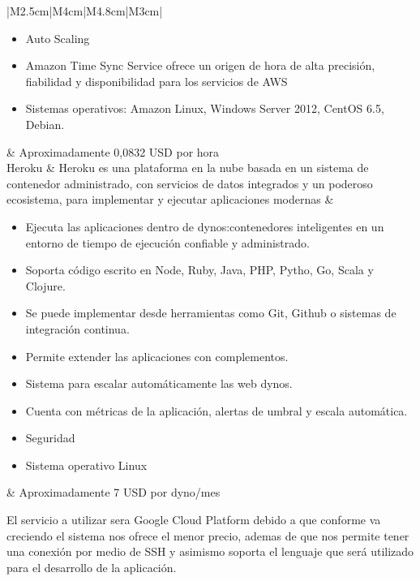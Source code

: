 \begin{longtable}{|M{2.5cm}|M{4cm}|M{4.8cm}|M{3cm}|}
\begin{itemize}
		\item Auto Scaling
		\item Amazon Time Sync Service ofrece un origen de hora de alta precisión, fiabilidad y disponibilidad para los servicios de AWS
		\item Sistemas operativos: Amazon Linux, Windows Server 2012, CentOS 6.5, Debian.
	\end{itemize} & Aproximadamente 0,0832 USD por hora \\ \hline
	Heroku & Heroku es una plataforma en la nube basada en un sistema de contenedor administrado, con servicios de datos integrados y un poderoso ecosistema, para implementar y ejecutar aplicaciones modernas &\begin{itemize}
		\item Ejecuta las aplicaciones dentro de dynos:contenedores inteligentes en un entorno de tiempo de ejecución confiable y administrado.
		\item Soporta código escrito en Node, Ruby, Java, PHP, Pytho, Go, Scala y Clojure.
		\item Se puede implementar desde herramientas como Git, Github o sistemas de integración continua.
		\item Permite extender las aplicaciones con complementos.
		\item Sistema para escalar automáticamente las web dynos.
		\item Cuenta con métricas de la aplicación, alertas de umbral y escala automática.
		\item Seguridad
		\item Sistema operativo Linux
	\end{itemize} & Aproximadamente 7 USD por dyno/mes \\ \hline
	\caption{Tabla comparativa de cloud servers}
	\label{tabla_servidores}
\end{longtable}
El servicio a utilizar sera Google Cloud Platform debido a que conforme va creciendo el sistema nos ofrece el menor precio, ademas de que nos permite tener una conexión por medio de SSH y asimismo soporta el lenguaje que será utilizado para el desarrollo de la aplicación.